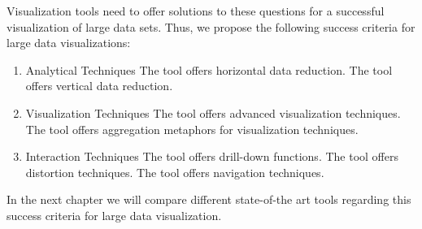 Visualization tools need to offer solutions to these questions for a successful visualization of large data sets. Thus, we propose the following success criteria for large data visualizations: 
\begin{enumerate}
\item Analytical Techniques
\subitem The tool offers horizontal data reduction.
\subitem The tool offers vertical data reduction.
\item Visualization Techniques
\subitem The tool offers advanced visualization techniques.
\subitem The tool offers aggregation metaphors for visualization techniques.
\item Interaction Techniques
\subitem The tool offers drill-down functions.
\subitem The tool offers distortion techniques.
\subitem The tool offers navigation techniques.
\end{enumerate}

In the next chapter we will compare different state-of-the art tools regarding this success criteria for large data visualization.
